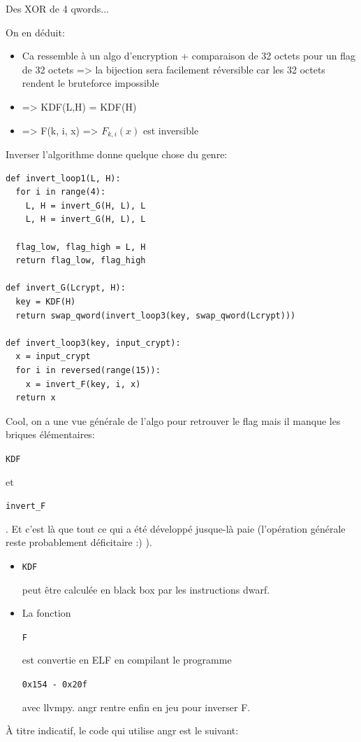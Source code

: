 \documentclass[14pt]{article}
\newcommand{\inlinebox}[2]{%
\colorbox{bg}{%
\parbox[b][0.6em]{\widthof{\texttt{#2}}}{\texttt{#2}}
}
}
\newcommand{\inlinepython}[1]{ \inlinebox{python}{#1} }
\newcommand{\inlinebash}[1]{ \inlinebox{bash}{#1} }
\theoremstyle{definition}
\begin{document}
Des XOR de 4 qwords...

On en déduit:
\begin{itemize}
  \item Ca ressemble à un algo d'encryption + comparaison de 32 octets pour un flag de 32 octets => la bijection sera facilement réversible car les 32 octets rendent le bruteforce impossible
  \item  => KDF(L,H) = KDF(H)
  \item  => F(k, i, x)  => $F_{k,i}(x)$ est inversible
\end{itemize}


Inverser l'algorithme donne quelque chose du genre:
\begin{verbatim}
def invert_loop1(L, H):
  for i in range(4):
    L, H = invert_G(H, L), L
    L, H = invert_G(H, L), L

  flag_low, flag_high = L, H
  return flag_low, flag_high

def invert_G(Lcrypt, H):
  key = KDF(H)
  return swap_qword(invert_loop3(key, swap_qword(Lcrypt)))

def invert_loop3(key, input_crypt):
  x = input_crypt
  for i in reversed(range(15)):
    x = invert_F(key, i, x)
  return x
\end{verbatim}


Cool, on a une vue générale de l'algo pour retrouver le flag mais il manque les briques élémentaires: \inlinepython{KDF} et \inlinepython{invert_F}.
Et c'est là que tout ce qui a été développé jusque-là paie (l'opération générale reste probablement déficitaire :) ).

\begin{itemize}
\item \inlinepython{KDF} peut être calculée en black box par les instructions dwarf.

\item La fonction \inlinepython{F} est convertie en ELF en compilant le programme \inlinebash{0x154 - 0x20f} avec llvmpy.
angr rentre enfin en jeu pour inverser F.
\end{itemize}
À titre indicatif, le code qui utilise angr est le suivant:
\end{document}
